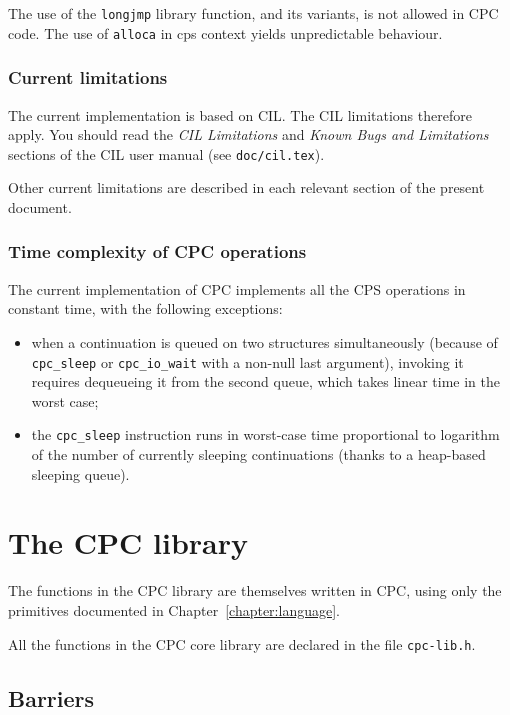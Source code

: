 \documentclass[a4paper]{report}
\begin{document}
The use of the {\tt longjmp} library function, and its variants, is
not allowed in CPC code.  The use of \texttt{alloca} in cps context
yields unpredictable behaviour.

\subsection{Current limitations}

The current implementation is based on CIL.  The CIL limitations
therefore apply.  You should read the \textit{CIL Limitations} and
\textit{Known Bugs and Limitations} sections of the CIL user manual
(see \texttt{doc/cil.tex}).

Other current limitations are described in each relevant section of the
present document.

\subsection{Time complexity of CPC operations}

The current implementation of CPC implements all the CPS operations in
constant time, with the following exceptions:
\begin{itemize} 
\item when a continuation is queued on two structures simultaneously
  (because of {\tt cpc\_sleep} or {\tt cpc\_io\_wait} with a non-null
  last argument), invoking it requires dequeueing it from the second
  queue, which takes linear time in the worst case;
\item the {\tt cpc\_sleep} instruction runs in worst-case time
  proportional to logarithm of the number of currently sleeping
  continuations (thanks to a heap-based sleeping queue).
\end{itemize}

\chapter{The CPC library}

The functions in the CPC library are themselves written in CPC, using
only the primitives documented in Chapter~\ref{chapter:language}.

All the functions in the CPC core library are declared in the file
{\tt cpc-lib.h}.

\section{Barriers}
\end{document}
